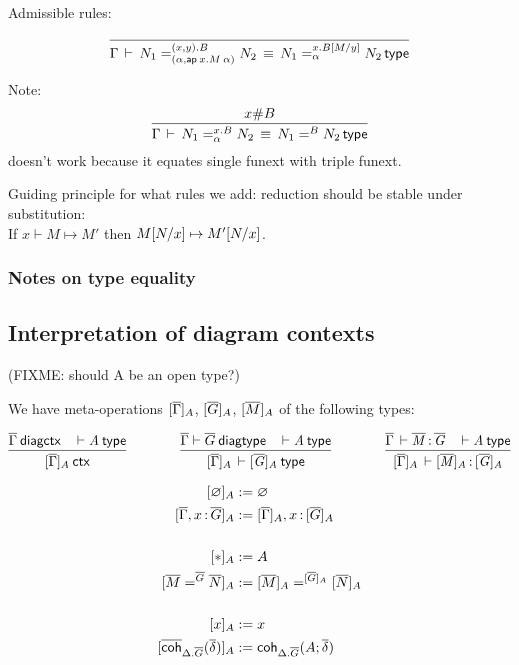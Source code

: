 Admissible rules:

\[
\infer{\deqtp{\Gamma}{\iidover{(x,y).B}{(\alpha,\ap{x.M}{\alpha})}{N_1}{N_2}}
                     {\iidover{x.\subst{B}{M}{y}}{\alpha}{N_1}{N_2}}}
      {}
\]


Note:
\[
\infer{\deqtp{\Gamma}{\iidover{x.B}{\alpha}{N_1}{N_2}}
                     {\iid{B}{N_1}{N_2}}}
      {x \# B}
\]
doesn't work because it equates single funext with triple funext.  

Guiding principle for what rules we add:
reduction should be stable under substitution: \\
If $x \vdash M \mapsto M'$ then $M [ N / x] \mapsto
M' [ N / x]$.  

\subsubsection{Notes on type equality}


\subsection{Interpretation of diagram contexts}

(FIXME: should A be an open type?)

We have meta-operations $[ \overline{\Gamma} ]_{A}$, $[ \overline{G} ]_{A}$, $[ \overline{M} ]_{A}$ of the following types:
\begin{small}
\[
\infer{\wfctx{\interpdiag{\diag\Gamma}{A}}}
      {\wfdiagctx{\diag\Gamma} & \wftp{}{A}}
\qquad\qquad
\infer{\wftp{\interpdiag{\diag\Gamma}{A}}{\interpdiag{\diag G}{A}}}
      {\wfdiagtp{\diag\Gamma}{\diag G} & \wftp{}{A}}
\qquad\qquad
\infer{\oftp{\interpdiag{\diag\Gamma}{A}}{\interpdiag{\diag M}{A}}{\interpdiag{\diag G}{A}}}
      {\oftp{\diag\Gamma}{\diag M}{\diag G} & \wftp{}{A}}
\]
\end{small}


\begin{small}
\[\begin{aligned}
\interpdiag{\emptyctx}{A} &:= \emptyctx \\
\interpdiag{\diag\Gamma,\tptm{x}{\diag G}}{A} &:=
\interpdiag{\diag\Gamma}{A},\tptm{x}{\interpdiaglob{\diag G}{A}} \\
&\\
\interpdiag{\diagbase}{A} &:= A \\
\interpdiag{\iid{\diag G}{\diag M}{\diag N}}{A} &:= \iid{\interpdiag{\diag
G}{A}}{\interpdiag{\diag M}A}{\interpdiag{\diag N}A} \\
&\\
\interpdiag{x}{A} &:= x \\
\interpdiag{\diagcoh{\Delta.\diag G}{\diag\delta}}{A} &:= 
\coh{\Delta.\diag G}{A}{\diag\delta}
\end{aligned}\]
\end{small}

